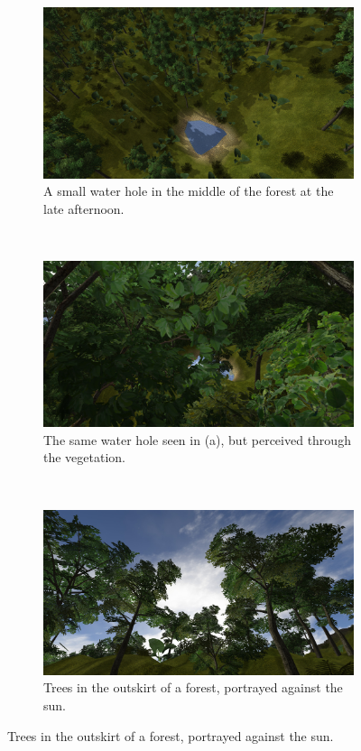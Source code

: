 \newpage
\begin{figure}[H]
\begin{subfigure}{0.9\textwidth}
  \centering
  \includegraphics[width=0.9\linewidth]{images/content1.jpg}
  \caption{A small water hole in the middle of the forest at the late afternoon.}
  \label{fig:vegetation0}
\end{subfigure}%
\\
\begin{subfigure}{0.9\textwidth}
  \centering
  \includegraphics[width=0.9\linewidth]{images/vegetation1.jpg}
  \caption{The same water hole seen in (a), but perceived through the vegetation.}
  \label{fig:vegetation1}
\end{subfigure}%
\\
\begin{subfigure}{0.9\textwidth}
  \centering
  \includegraphics[width=0.9\linewidth]{images/vegetation2.jpg}
  \caption{Trees in the outskirt of a forest, portrayed against the sun.}
  \label{fig:vegetation2}
\end{subfigure}
\label{fig:vegetationViwes}
\end{figure}

